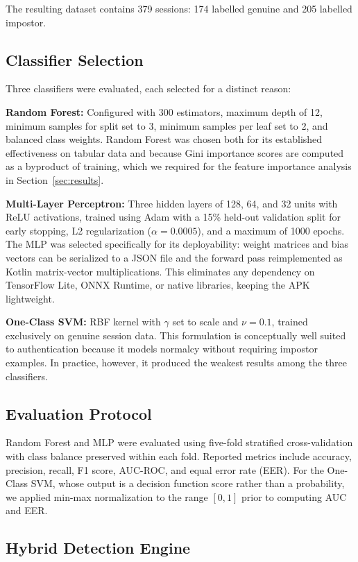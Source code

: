 \documentclass[conference]{IEEEtran}
\begin{document}
The resulting dataset contains 379 sessions: 174 labelled genuine and 205 labelled impostor.

\subsection{Classifier Selection}

Three classifiers were evaluated, each selected for a distinct reason:

\textbf{Random Forest:} Configured with 300 estimators, maximum depth of 12, minimum samples for split set to 3, minimum samples per leaf set to 2, and balanced class weights. Random Forest was chosen both for its established effectiveness on tabular data and because Gini importance scores are computed as a byproduct of training, which we required for the feature importance analysis in Section~\ref{sec:results}.

\textbf{Multi-Layer Perceptron:} Three hidden layers of 128, 64, and 32 units with ReLU activations, trained using Adam with a 15\% held-out validation split for early stopping, L2 regularization ($\alpha = 0.0005$), and a maximum of 1000 epochs. The MLP was selected specifically for its deployability: weight matrices and bias vectors can be serialized to a JSON file and the forward pass reimplemented as Kotlin matrix-vector multiplications. This eliminates any dependency on TensorFlow Lite, ONNX Runtime, or native libraries, keeping the APK lightweight.

\textbf{One-Class SVM:} RBF kernel with $\gamma$ set to scale and $\nu = 0.1$, trained exclusively on genuine session data. This formulation is conceptually well suited to authentication because it models normalcy without requiring impostor examples. In practice, however, it produced the weakest results among the three classifiers.

\subsection{Evaluation Protocol}

Random Forest and MLP were evaluated using five-fold stratified cross-validation with class balance preserved within each fold. Reported metrics include accuracy, precision, recall, F1 score, AUC-ROC, and equal error rate (EER). For the One-Class SVM, whose output is a decision function score rather than a probability, we applied min-max normalization to the range $[0, 1]$ prior to computing AUC and EER.

\subsection{Hybrid Detection Engine}
\label{sec:hybrid}
\end{document}
